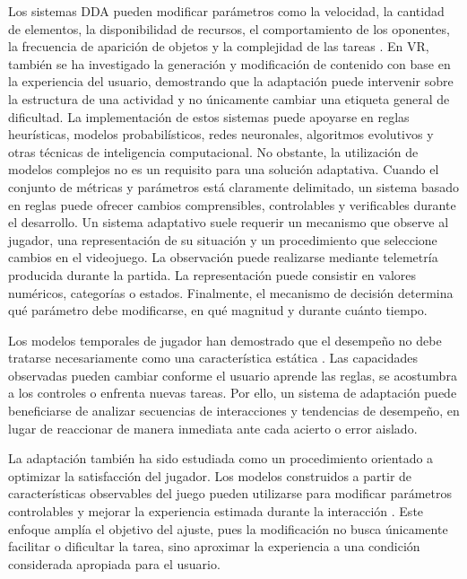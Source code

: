 Los sistemas DDA pueden modificar parámetros como la velocidad, la 
cantidad de elementos, la disponibilidad de recursos, el comportamiento 
de los oponentes, la frecuencia de aparición de objetos y la complejidad 
de las tareas \cite{zohaib2018dda,huber2021dda}. En VR, también se ha 
investigado la generación y modificación de contenido con base en la 
experiencia del usuario, demostrando que la adaptación puede intervenir 
sobre la estructura de una actividad y no únicamente cambiar una 
etiqueta general de dificultad. La implementación de estos sistemas 
puede apoyarse en reglas heurísticas, modelos probabilísticos, 
redes neuronales, algoritmos evolutivos y otras técnicas de inteligencia 
computacional. No obstante, la utilización de modelos complejos no es un 
requisito para una solución adaptativa. Cuando el conjunto de métricas y 
parámetros está claramente delimitado, un sistema basado en reglas puede 
ofrecer cambios comprensibles, controlables y verificables durante el 
desarrollo. Un sistema adaptativo suele requerir un mecanismo que 
observe al jugador, una representación de su situación y un 
procedimiento que seleccione cambios en el videojuego. La observación 
puede realizarse mediante telemetría producida durante la partida. La 
representación puede consistir en valores numéricos, categorías o 
estados. Finalmente, el mecanismo de decisión determina qué parámetro 
debe modificarse, en qué magnitud y durante cuánto tiempo.

Los modelos temporales de jugador han demostrado que el desempeño no 
debe tratarse necesariamente como una característica estática \cite{zook2012temporal}.
Las capacidades observadas pueden cambiar conforme el usuario aprende 
las reglas, se acostumbra a los controles o enfrenta nuevas tareas. Por 
ello, un sistema de adaptación puede beneficiarse de analizar secuencias 
de interacciones y tendencias de desempeño, en lugar de reaccionar de 
manera inmediata ante cada acierto o error aislado.

La adaptación también ha sido estudiada como un procedimiento orientado 
a optimizar la satisfacción del jugador. Los modelos construidos a partir 
de características observables del juego pueden utilizarse para modificar 
parámetros controlables y mejorar la experiencia estimada durante la 
interacción \cite{yannakakis2009adaptation}. Este enfoque amplía el 
objetivo del ajuste, pues la modificación no busca únicamente facilitar 
o dificultar la tarea, sino aproximar la experiencia a una condición 
considerada apropiada para el usuario.

